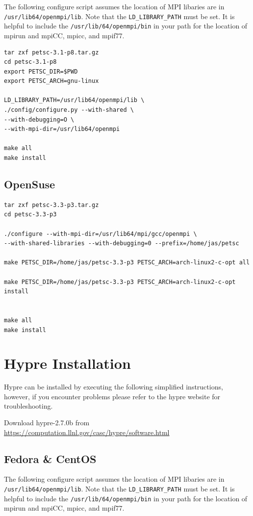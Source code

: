 \documentclass[12pt]{article}
\begin{document}
The following configure script assumes the location of MPI libaries
are in \texttt{/usr/lib64/openmpi/lib}.  Note that the
\texttt{LD\_LIBRARY\_PATH} must be set.  It is helpful to include the
\texttt{/usr/lib/64/openmpi/bin} in your path for the location of
mpirun and mpiCC, mpicc, and mpif77.

\begin{verbatim}
tar zxf petsc-3.1-p8.tar.gz
cd petsc-3.1-p8
export PETSC_DIR=$PWD
export PETSC_ARCH=gnu-linux

LD_LIBRARY_PATH=/usr/lib64/openmpi/lib \
./config/configure.py --with-shared \
--with-debugging=O \
--with-mpi-dir=/usr/lib64/openmpi

make all
make install
\end{verbatim}

\subsection{OpenSuse}

\begin{verbatim}
tar zxf petsc-3.3-p3.tar.gz
cd petsc-3.3-p3

./configure --with-mpi-dir=/usr/lib64/mpi/gcc/openmpi \
--with-shared-libraries --with-debugging=0 --prefix=/home/jas/petsc

make PETSC_DIR=/home/jas/petsc-3.3-p3 PETSC_ARCH=arch-linux2-c-opt all

make PETSC_DIR=/home/jas/petsc-3.3-p3 PETSC_ARCH=arch-linux2-c-opt
install


make all
make install
\end{verbatim}


\section{Hypre Installation}

Hypre can be installed by executing the following simplified
instructions, however, if you encounter problems please refer to the
hypre website for troubleshooting.

Download hypre-2.7.0b from
\url{https://computation.llnl.gov/casc/hypre/software.html}

\subsection{Fedora \& CentOS}

The following configure script assumes the location of MPI libaries
are in \texttt{/usr/lib64/openmpi/lib}.  Note that the
\texttt{LD\_LIBRARY\_PATH} must be set.  It is helpful to include the
\texttt{/usr/lib/64/openmpi/bin} in your path for the location of
mpirun and mpiCC, mpicc, and mpif77.
\end{document}
